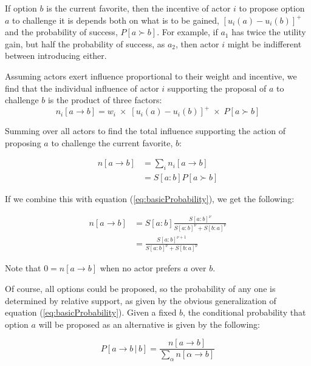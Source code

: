\documentclass[a4paper,10pt]{article}
\begin{document}
If option $b$
  is the current favorite, then the incentive of actor $i$
  to propose option $a$
  to challenge it is depends both on what is to be gained, $\left[u_{i}\left(a\right)-u_{i}\left(b\right)\right]^{+}$
  and the probability of success, $P\left[a\succ b\right]$.
 For example, if $a_1$ has twice the utility gain, but half the probability of success, as $a_2$, then actor $i$ might be indifferent
between introducing either.

Assuming actors exert influence proportional to their weight and incentive, we find that the individual influence of
 actor $i$ supporting the proposal of $a$   to challenge $b$   is the product of three  factors:
\begin{equation}
n_{i}[a \rightarrow b  ] = w_i \; \times \;  \left[u_{i}\left(a\right)-u_{i}\left(b\right)\right]^{+} \; \times \; P\left[a\succ b\right] 
\end{equation}


Summing over all actors to find the total influence supporting the action of proposing $a$ to challenge the current favorite, $b$:

\begin{align}
n[a  \rightarrow b  ] 
  & = \sum_i n_{i}[a  \rightarrow b  ]  \\ 
  &= S[a:b]  P\left[a\succ b\right]  
\end{align}

If we combine this with equation (\ref{eq:basicProbability}), we get the following:

\begin{align}
n[a  \rightarrow b   ] 
  &= S[a:b]  \frac { S[a:b]^\nu} { S[a:b]^\nu+ S[b:a]^\nu}  \\
  &=   \frac { S[a:b]^{\nu+1}} {  S[a:b]^\nu+ S[b:a]^\nu} 
\end{align}

Note that $0 = n[a  \rightarrow b  ]  $  when no actor prefers $a$ over $b$. 

Of course, all options could be proposed, so the probability of any one is determined by relative support, as given by the 
obvious generalization of equation   (\ref{eq:basicProbability}). Given  a fixed $b$, the conditional probability that option $a$ will be
 proposed as an alternative is given by the following:


\begin{equation}\label{eq:chlgProbs}
P[a  \rightarrow b  \, | \, b] = \frac {n[a  \rightarrow b   ] }  { \sum_{\alpha} n[\alpha  \rightarrow b   ]  }  
\end{equation}
\end{document}
